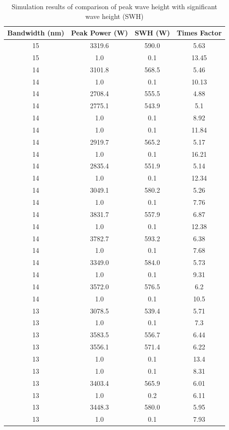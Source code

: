 \begin{table}[htbp]
\centering
\caption{Simulation results of comparison of peak wave height with significant wave height (SWH)}
\label{tab:rogue_wave_bw}
\renewcommand{\arraystretch}{1.2}
\begin{tabular}{c c c c}
\hline
\textbf{Bandwidth (nm)} & \textbf{Peak Power (W)} & \textbf{SWH (W)} & \textbf{Times Factor} \\
\hline
15 & 3319.6 & 590.0 & 5.63 \\
15 & 1.0 & 0.1 & 13.45 \\
14 & 3101.8 & 568.5 & 5.46 \\
14 & 1.0 & 0.1 & 10.13 \\
14 & 2708.4 & 555.5 & 4.88 \\
14 & 2775.1 & 543.9 & 5.1 \\
14 & 1.0 & 0.1 & 8.92 \\
14 & 1.0 & 0.1 & 11.84 \\
14 & 2919.7 & 565.2 & 5.17 \\
14 & 1.0 & 0.1 & 16.21 \\
14 & 2835.4 & 551.9 & 5.14 \\
14 & 1.0 & 0.1 & 12.34 \\
14 & 3049.1 & 580.2 & 5.26 \\
14 & 1.0 & 0.1 & 7.76 \\
14 & 3831.7 & 557.9 & 6.87 \\
14 & 1.0 & 0.1 & 12.38 \\
14 & 3782.7 & 593.2 & 6.38 \\
14 & 1.0 & 0.1 & 7.68 \\
14 & 3349.0 & 584.0 & 5.73 \\
14 & 1.0 & 0.1 & 9.31 \\
14 & 3572.0 & 576.5 & 6.2 \\
14 & 1.0 & 0.1 & 10.5 \\
13 & 3078.5 & 539.4 & 5.71 \\
13 & 1.0 & 0.1 & 7.3 \\
13 & 3583.5 & 556.7 & 6.44 \\
13 & 3556.1 & 571.4 & 6.22 \\
13 & 1.0 & 0.1 & 13.4 \\
13 & 1.0 & 0.1 & 8.31 \\
13 & 3403.4 & 565.9 & 6.01 \\
13 & 1.0 & 0.2 & 6.11 \\
13 & 3448.3 & 580.0 & 5.95 \\
13 & 1.0 & 0.1 & 7.93 \\

\end{tabular}
\end{table}
